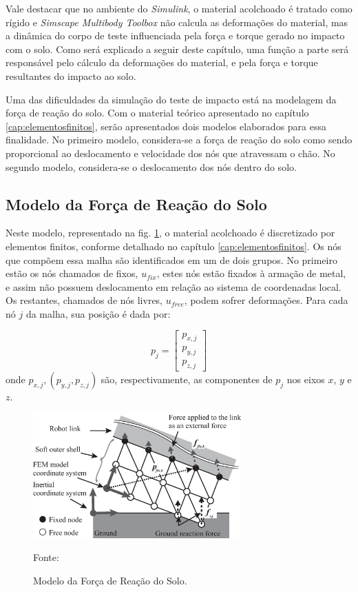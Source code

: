 Vale destacar que no ambiente do \textit{Simulink}, o material acolchoado é tratado como rígido e \textit{Simscape Multibody Toolbox} não calcula as deformações do material, mas a dinâmica do corpo de teste influenciada pela força e torque gerado no impacto com o solo. 
Como será explicado a seguir deste capítulo, uma função a parte será responsável pelo cálculo da deformações do material, e pela força e torque resultantes do impacto ao solo.

Uma das dificuldades da simulação do teste de impacto está na modelagem da força de reação do solo.
Com o material teórico apresentado no capítulo \ref{cap:elementosfinitos}, serão apresentados dois modelos elaborados para essa finalidade. No primeiro modelo, considera-se a força de reação do solo como sendo proporcional ao deslocamento e velocidade dos nós que atravessam o chão. No segundo modelo, considera-se o deslocamento dos nós dentro do solo. 

\subsection{Modelo da Força de Reação do Solo}

Neste modelo, representado na fig. \ref{fig:reactionforcemodel}, o material acolchoado é discretizado por elementos finitos, conforme detalhado no capítulo \ref{cap:elementosfinitos}. Os nós que compõem essa malha são identificados em um de dois grupos. No primeiro estão os nós chamados de fixos, $u_{fix}$, estes nós estão fixados à armação de metal, e assim não possuem deslocamento em relação ao sistema de coordenadas local. Os restantes, chamados de nós livres, $u_{free}$, podem sofrer deformações. 
Para cada nó $j$ da malha, sua posição é dada por:

\begin{equation} \label{eq:position}
    p_{j} = 
    \begin{bmatrix}
        p_{x,j}
        \\
        p_{y,j}
        \\
        p_{z,j}
    \end{bmatrix}
\end{equation}
onde $p_{x,j}, (p_{y,j}, p_{z,j})$ são, respectivamente, as componentes de $p_{j}$ nos eixos $x$, $y$ e $z$.

 \begin{figure}[H] 
        \centering
        \caption{Modelo da Força de Reação do Solo.}
        \includegraphics[width=8cm]{./figs/fig2_FEM-MBD_model.eps}
        \par\medskip
        Fonte: 
        \label{fig:reactionforcemodel}
\end{figure}

